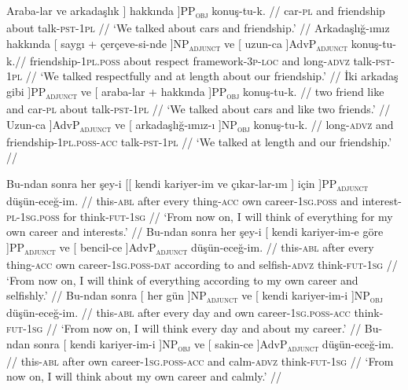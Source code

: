 \pex[exno=TS2,glspace=!1em,everygla={},everyglb={},aboveglbskip=-.15ex, interpartskip=15pt]
\label{TS2}
\a
\begingl
\gla {[[} Araba-lar ve {arkadaşlık }] { hakkında }]PP\textsubscript{\textsc{obj}} konuş-tu-k. //
\glb {} car-\textsc{pl} and friendship about talk-\textsc{pst}-\textsc{1pl} //
\glft `We talked about cars and friendship.' //
\endgl
\a
\begingl
\gla Arkadaşlığ-ımız hakkında {[} saygı + {çerçeve-si-nde }]NP\textsubscript{\textsc{adjunct}} ve {[} {uzun-ca }]AdvP\textsubscript{\textsc{adjunct}} konuş-tu-k.//
\glb friendship-\textsc{1pl.poss} about respect framework-\textsc{3p}-\textsc{loc} and long-\textsc{advz}  talk-\textsc{pst}-\textsc{1pl} //
\glft `We talked respectfully and at length about our friendship.' //
\endgl
\a 
\begingl
\gla {[} İki arkadaş { gibi }]PP\textsubscript{\textsc{adjunct}} ve {[} araba-lar  + { hakkında }]PP\textsubscript{\textsc{obj}} konuş-tu-k. //
\glb two friend like and car-\textsc{pl} about talk-\textsc{pst}-\textsc{1pl} //
\glft `We talked about cars and like two friends.' //
\endgl
\a
\begingl
\gla {[} {Uzun-ca }]AdvP\textsubscript{\textsc{adjunct}} ve {[} { arkadaşlığ-ımız-ı }]NP\textsubscript{\textsc{obj}} konuş-tu-k. //
\glb long-\textsc{advz} and friendship-\textsc{1pl.poss}-\textsc{acc}  talk-\textsc{pst}-\textsc{1pl} //
\glft `We talked at length and our friendship.' //
\endgl
\xe

\pex[exno=TS3,glspace=!1em,everygla={},everyglb={},aboveglbskip=-.15ex, interpartskip=15pt]
\label{TS3} 
\a
\begingl
\gla Bu-ndan sonra her şey-i {[[} kendi kariyer-im ve {çıkar-lar-ım }] { için }]PP\textsubscript{\textsc{adjunct}} düşün-eceğ-im. //
\glb this-\textsc{abl} after every thing-\textsc{acc} {} own career-\textsc{1sg.poss} and interest-\textsc{pl}-\textsc{1sg.poss} for think-\textsc{fut}-\textsc{1sg} //
\glft `From now on, I will think of everything for my own career and interests.' //
\endgl
\a \begingl
\gla Bu-ndan sonra her şey-i {[} kendi kariyer-im-e { göre }]PP\textsubscript{\textsc{adjunct}} ve {[} {bencil-ce }]AdvP\textsubscript{\textsc{adjunct}} düşün-eceğ-im. //
\glb this-\textsc{abl} after every thing-\textsc{acc} own career-\textsc{1sg.poss}-\textsc{dat} {according to} and selfish-\textsc{advz} think-\textsc{fut}-\textsc{1sg} //
\glft `From now on, I will think of everything according to my own career and selfishly.' //
\endgl
\a
\begingl
\gla Bu-ndan sonra {[} her { gün }]NP\textsubscript{\textsc{adjunct}} ve {[} kendi {kariyer-im-i }]NP\textsubscript{\textsc{obj}} düşün-eceğ-im. //
\glb this-\textsc{abl} after every day and own career-\textsc{1sg.poss}-\textsc{acc} think-\textsc{fut}-\textsc{1sg} //
\glft `From now on, I will think every day and about my career.' //
\endgl
\a
\begingl
\gla Bu-ndan sonra {[} kendi { kariyer-im-i }]NP\textsubscript{\textsc{obj}} ve {[} { sakin-ce }]AdvP\textsubscript{\textsc{adjunct}} düşün-eceğ-im. //
\glb this-\textsc{abl} after own career-\textsc{1sg.poss}-\textsc{acc} and calm-\textsc{advz} think-\textsc{fut}-\textsc{1sg} //
\glft `From now on, I will think about my own career and calmly.' //
\endgl
\xe


